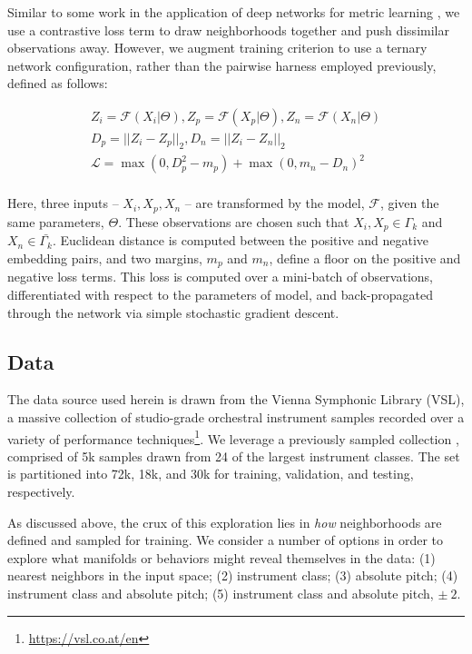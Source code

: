 \documentclass{article}
\begin{document}
Similar to some work in the application of deep networks for metric learning \cite{hadsell2006drlim, humphrey2011nlse, humphrey2015dl4mir}, we use a contrastive loss term to draw neighborhoods together and push dissimilar observations away.
However, we augment training criterion to use a ternary network configuration, rather than the pairwise harness employed previously, defined as follows:

\begin{align*}
Z_i = \mathcal{F}(X_i | \Theta), Z_p = \mathcal{F}(X_p | \Theta), Z_n = \mathcal{F}(X_n | \Theta)\\
D_p = || Z_i - Z_p ||_2, D_n = || Z_i - Z_n ||_2\\
\mathcal{L} = \max(0, D_p^2 - m_{p}) + \max(0, m_{n} - D_n)^2 \\
\end{align*}

Here, three inputs -- $X_i, X_p, X_n$ -- are transformed by the model, $\mathcal{F}$, given the same parameters, $\Theta$.
These observations are chosen such that $X_i, X_p \in \Gamma_k$ and $X_n \in \bar{\Gamma_k}$.
Euclidean distance is computed between the positive and negative embedding pairs, and two margins, $m_p$ and $m_n$, define a floor on the positive and negative loss terms.
This loss is computed over a mini-batch of observations, differentiated with respect to the parameters of model, and back-propagated through the network via simple stochastic gradient descent.

\subsection{Data}

The data source used herein is drawn from the Vienna Symphonic Library (VSL), a massive collection of studio-grade orchestral instrument samples recorded over a variety of performance techniques\footnote{\url{https://vsl.co.at/en}}.
We leverage a previously sampled collection \cite{humphrey2015dl4mir}, comprised of 5k samples drawn from 24 of the largest instrument classes.
The set is partitioned into 72k, 18k, and 30k for training, validation, and testing, respectively.

As discussed above, the crux of this exploration lies in \emph{how} neighborhoods are defined and sampled for training.
We consider a number of options in order to explore what manifolds or behaviors might reveal themselves in the data:
(1) nearest neighbors in the input space;
(2) instrument class;
(3) absolute pitch;
(4) instrument class and absolute pitch;
(5) instrument class and absolute pitch, $\pm~2$.
\end{document}
